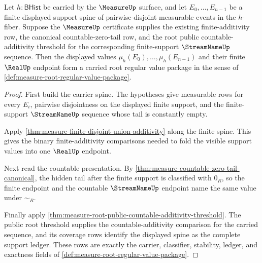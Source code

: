 \begin{theorem}
\label{thm:measure-root-finite-regular-value-closure}
Let $h:\mathsf{BHist}$ be carried by the $\MeasureUp$ surface, and let
$E_0,\ldots,E_{n-1}$ be a finite displayed support spine of pairwise-disjoint
measurable events in the $h$-fiber. Suppose the $\MeasureUp$ certificate
supplies the existing finite-additivity row, the canonical countable-zero-tail
row, and the root public countable-additivity threshold for the corresponding
finite-support $\StreamNameUp$ sequence. Then the displayed values
$\mu_h(E_0),\ldots,\mu_h(E_{n-1})$ and their finite $\RealUp$ endpoint form a
carried root regular value package in the sense of
\autoref{def:measure-root-regular-value-package}.
\end{theorem}
\begin{proof}
First build the carrier spine. The hypotheses give measurable rows for every
$E_i$, pairwise disjointness on the displayed finite support, and the
finite-support $\StreamNameUp$ sequence whose tail is constantly empty.

Apply \autoref{thm:measure-finite-disjoint-union-additivity} along the finite
spine. This gives the binary finite-additivity comparisons needed to fold the
visible support values into one $\RealUp$ endpoint.

Next read the countable presentation. By
\autoref{thm:measure-countable-zero-tail-canonical}, the hidden tail after the
finite support is classified with $0_R$, so the finite endpoint and the
countable $\StreamNameUp$ endpoint name the same value under $\sim_R$.

Finally apply
\autoref{thm:measure-root-public-countable-additivity-threshold}. The public
root threshold supplies the countable-additivity comparison for the carried
sequence, and its coverage rows identify the displayed spine as the complete
support ledger. These rows are exactly the carrier, classifier, stability,
ledger, and exactness fields of
\autoref{def:measure-root-regular-value-package}.
\end{proof}

